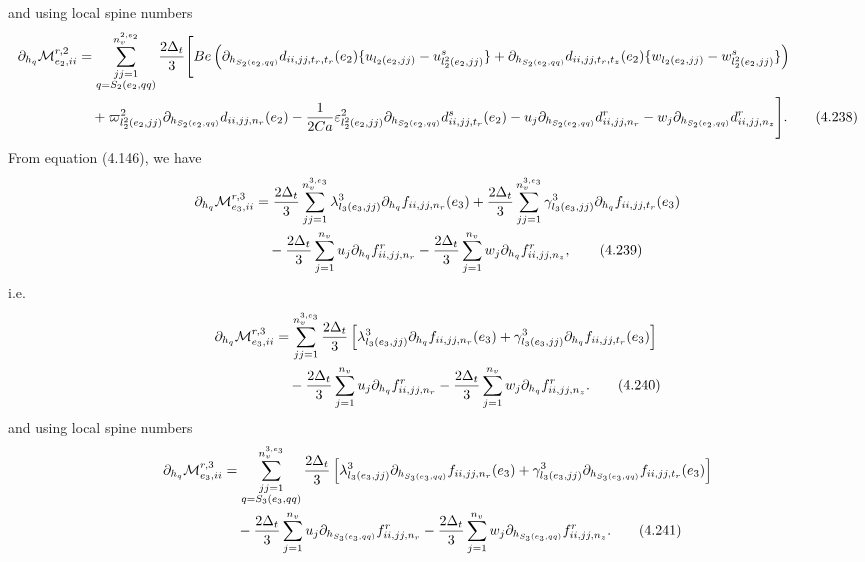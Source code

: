 \documentclass{article}
\begin{document}
and using local spine numbers
\begin{align}
\partial_{h_q}\mathcal{M}_{e_2,ii}^{r,2} &= \sum_{\substack{jj=1\\ q=S_2(e_2,qq)}}^{n_v^{2,e_2}} \frac{2\Delta_t}{3} \Bigg[ Be \left( \partial_{h_{S_2(e_2,qq)}} d_{ii,jj,t_r,t_r}(e_2) \{ u_{l_2(e_2,jj)} - u_{l_2^2(e_2,jj)}^s \} 
+ \partial_{h_{S_2(e_2,qq)}} d_{ii,jj,t_r,t_z}(e_2) \{ w_{l_2(e_2,jj)} - w_{l_2^2(e_2,jj)}^s \} \right) \nonumber\\
&\quad + \varpi_{l_2^2(e_2,jj)}^2 \partial_{h_{S_2(e_2,qq)}} d_{ii,jj,n_r}(e_2) 
- \frac{1}{2Ca} \varepsilon_{l_2^2(e_2,jj)}^2 \partial_{h_{S_2(e_2,qq)}} d_{ii,jj,t_r}^s(e_2) 
- u_j \partial_{h_{S_2(e_2,qq)}} d_{ii,jj,n_r}^r 
- w_j \partial_{h_{S_2(e_2,qq)}} d_{ii,jj,n_z}^r \Bigg]. \tag{4.238}
\end{align}
From equation (4.146), we have
\begin{align}
\partial_{h_q}\mathcal{M}_{e_3,ii}^{r,3} &= \frac{2\Delta_t}{3} \sum_{jj=1}^{n_v^{3,e_3}} \lambda_{l_3(e_3,jj)}^3 \partial_{h_q} f_{ii,jj,n_r}(e_3) 
+ \frac{2\Delta_t}{3} \sum_{jj=1}^{n_v^{3,e_3}} \gamma_{l_3(e_3,jj)}^3 \partial_{h_q} f_{ii,jj,t_r}(e_3) \nonumber\\
&\quad - \frac{2\Delta_t}{3} \sum_{j=1}^{n_v} u_j \partial_{h_q} f_{ii,jj,n_r}^r 
- \frac{2\Delta_t}{3} \sum_{j=1}^{n_v} w_j \partial_{h_q} f_{ii,jj,n_z}^r, \tag{4.239}
\end{align}
i.e.
\begin{align}
\partial_{h_q}\mathcal{M}_{e_3,ii}^{r,3} &= \sum_{jj=1}^{n_v^{3,e_3}} \frac{2\Delta_t}{3} \left[ \lambda_{l_3(e_3,jj)}^3 \partial_{h_q} f_{ii,jj,n_r}(e_3) + \gamma_{l_3(e_3,jj)}^3 \partial_{h_q} f_{ii,jj,t_r}(e_3) \right] \nonumber\\
&\quad - \frac{2\Delta_t}{3} \sum_{j=1}^{n_v} u_j \partial_{h_q} f_{ii,jj,n_r}^r 
- \frac{2\Delta_t}{3} \sum_{j=1}^{n_v} w_j \partial_{h_q} f_{ii,jj,n_z}^r. \tag{4.240}
\end{align}
and using local spine numbers
\begin{align}
\partial_{h_q}\mathcal{M}_{e_3,ii}^{r,3} &= \sum_{\substack{jj=1\\ q=S_3(e_3,qq)}}^{n_v^{3,e_3}} \frac{2\Delta_t}{3} \left[ \lambda_{l_3(e_3,jj)}^3 \partial_{h_{S_3(e_3,qq)}} f_{ii,jj,n_r}(e_3) + \gamma_{l_3(e_3,jj)}^3 \partial_{h_{S_3(e_3,qq)}} f_{ii,jj,t_r}(e_3) \right] \nonumber\\
&\quad - \frac{2\Delta_t}{3} \sum_{j=1}^{n_v} u_j \partial_{h_{S_3(e_3,qq)}} f_{ii,jj,n_r}^r 
- \frac{2\Delta_t}{3} \sum_{j=1}^{n_v} w_j \partial_{h_{S_3(e_3,qq)}} f_{ii,jj,n_z}^r. \tag{4.241}
\end{align}
\end{document}
